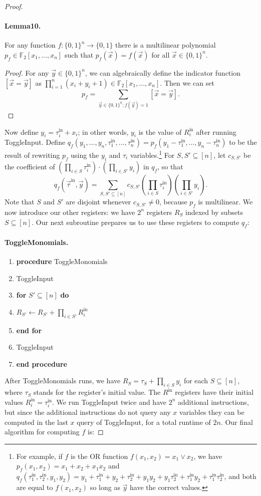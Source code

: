 \documentclass[10pt,a4paper]{article}
\begin{document}
\begin{proof}
\paragraph{Lemma10.} For any function $f:\{0,1\}^n\to\{0,1\}$ there is a multilinear polynomial $p_f\in\mathbb F_2[x_1,\ldots,x_n]$ such that $p_f(\vec x)=f(\vec x)$ for all $\vec x\in\{0,1\}^n$.
\begin{proof}
For any $\vec y\in\{0,1\}^n$, we can algebraically define the indicator function $[\vec x=\vec y]$ as $\prod_{i=1}^n(x_i+y_i+1)\in\mathbb F_2[x_1,\ldots,x_n]$. Then we can set
\[p_f=\sum_{\vec y\in\{0,1\}^n:f(\vec y)=1}[\vec x=\vec y].\]
\end{proof}
Now define $y_i=\tau_i^{\mathrm{in}}+x_i$; in other words, $y_i$ is the value of $R_i^{\mathrm{in}}$ after running ToggleInput. Define $q_f(y_1,\ldots,y_n,\tau_1^{\mathrm{in}},\ldots,\tau_n^{\mathrm{in}})=p_f(y_1-\tau_1^{\mathrm{in}},\ldots,y_n-\tau_n^{\mathrm{in}})$ to be the result of rewriting $p_f$ using the $y_i$ and $\tau_i$ variables.\footnote{For example, if $f$ is the OR function $f(x_1,x_2)=x_1\lor x_2$, we have $p_f(x_1,x_2)=x_1+x_2+x_1x_2$ and $q_f(\tau_1^{\mathrm{in}},\tau_2^{\mathrm{in}},y_1,y_2)=y_1+\tau_1^{\mathrm{in}}+y_2+\tau_2^{\mathrm{in}}+y_1y_2+y_1\tau_2^{\mathrm{in}}+\tau_1^{\mathrm{in}}y_2+\tau_1^{\mathrm{in}}\tau_2^{\mathrm{in}}$, and both are equal to $f(x_1,x_2)$ so long as $\vec y$ have the correct values.} For $S,S'\subseteq[n]$, let $c_{S,S'}$ be the coefficient of $(\prod_{i\in S}\tau_i^{\mathrm{in}})\cdot(\prod_{i\in S'}y_i)$ in $q_f$, so that
\[q_f(\vec\tau^{\mathrm{in}},\vec y)=\sum_{S,S'\subseteq[n]}c_{S,S'}\left(\prod_{i\in S}\tau_i^{\mathrm{in}}\right)\left(\prod_{i\in S'}y_i\right).\]
Note that $S$ and $S'$ are disjoint whenever $c_{S,S'}\neq0$, because $p_f$ is multilinear. We now introduce our other registers: we have $2^n$ registers $R_S$ indexed by subsets $S\subseteq[n]$. Our next subroutine prepares us to use these registers to compute $q_f$:
\paragraph{ToggleMonomials.}
\begin{enumerate}[label=\arabic*:]
\item \textbf{procedure} ToggleMonomials
\item ToggleInput
\item \textbf{for} $S'\subseteq[n]$ \textbf{do}
\item $R_{S'}\leftarrow R_{S'}+\prod_{i\in S'}R_i^{\mathrm{in}}$
\item \textbf{end for}
\item ToggleInput
\item \textbf{end procedure}
\end{enumerate}
After ToggleMonomials runs, we have $R_S=\tau_S+\prod_{i\in S}y_i$ for each $S\subseteq[n]$, where $\tau_S$ stands for the register's initial value. The $R^{\mathrm{in}}$ registers have their initial values $R_i^{\mathrm{in}}=\tau_i^{\mathrm{in}}$. We run ToggleInput twice and have $2^n$ additional instructions, but since the additional instructions do not query any $x$ variables they can be computed in the last $x$ query of ToggleInput, for a total runtime of $2n$.
Our final algorithm for computing $f$ is:

\end{proof}
\end{document}
